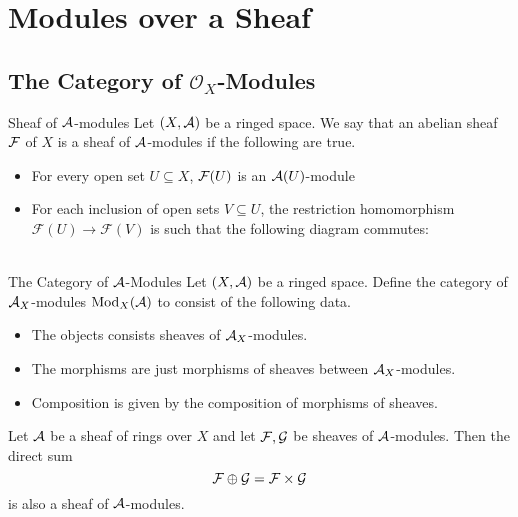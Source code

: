 \documentclass[a4paper]{article}
\begin{document}
\pagebreak
\section{Modules over a Sheaf}
\subsection{The Category of $\mathcal{O}_X$-Modules}
\begin{defn}{Sheaf of $\mathcal{A}$-modules}{} Let $(X,\mathcal{A})$ be a ringed space. We say that an abelian sheaf $\mathcal{F}$ of $X$ is a sheaf of $\mathcal{A}$-modules if the following are true. 
\begin{itemize}
\item For every open set $U\subseteq X$, $\mathcal{F}(U)$ is an $\mathcal{A}(U)$-module
\item For each inclusion of open sets $V\subseteq U$, the restriction homomorphism $\mathcal{F}(U)\to\mathcal{F}(V)$ is such that the following diagram commutes: \\~\\
\end{itemize}
\end{defn}

\begin{defn}{The Category of $\mathcal{A}$-Modules}{} Let $(X,\mathcal{A})$ be a ringed space. Define the category of $\mathcal{A}_X$-modules $\text{Mod}_X(\mathcal{A})$ to consist of the following data. 
\begin{itemize}
\item The objects consists sheaves of $\mathcal{A}_X$-modules. 
\item The morphisms are just morphisms of sheaves between $\mathcal{A}_X$-modules. 
\item Composition is given by the composition of morphisms of sheaves. 
\end{itemize}
\end{defn}

\begin{prp}{}{} Let $\mathcal{A}$ be a sheaf of rings over $X$ and let $\mathcal{F},\mathcal{G}$ be sheaves of $\mathcal{A}$-modules. Then the direct sum $$\mathcal{F}\oplus\mathcal{G}=\mathcal{F}\times\mathcal{G}$$ is also a sheaf of $\mathcal{A}$-modules. 
\end{prp}
\end{document}
